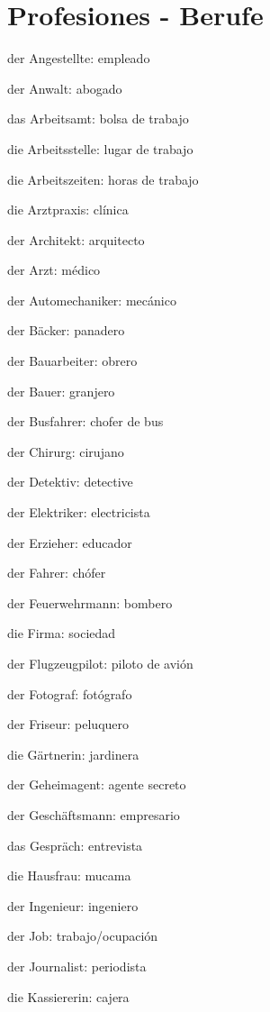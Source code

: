 \section{Profesiones - Berufe}
\begin{multicols}{2}
\begin{myitemize}
\item der Angestellte: empleado
\item der Anwalt: abogado
\item das Arbeitsamt: bolsa de trabajo
\item die Arbeitsstelle: lugar de trabajo
\item die Arbeitszeiten: horas de trabajo
\item die Arztpraxis: clínica
\item der Architekt: arquitecto
\item der Arzt: médico
\item der Automechaniker: mecánico
\item der Bäcker: panadero
\item der Bauarbeiter: obrero
\item der Bauer: granjero
\item der Busfahrer: chofer de bus
\item der Chirurg: cirujano
\item der Detektiv: detective
\item der Elektriker: electricista
\item der Erzieher: educador
\item der Fahrer: chófer
\item der Feuerwehrmann: bombero
\item die Firma: sociedad
\item der Flugzeugpilot: piloto de avión
\item der Fotograf: fotógrafo
\item der Friseur: peluquero
\item die Gärtnerin: jardinera
\item der Geheimagent: agente secreto
\item der Geschäftsmann: empresario
\item das Gespräch: entrevista
\item die Hausfrau: mucama
\item der Ingenieur: ingeniero
\item der Job: trabajo/ocupación
\item der Journalist: periodista
\item die Kassiererin: cajera

\end{myitemize}
\end{multicols}
